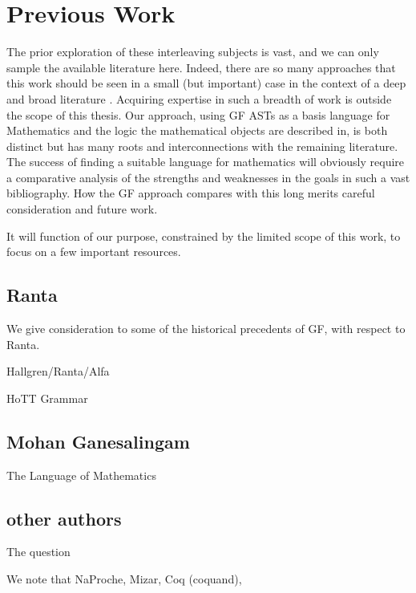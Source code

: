 \section{Previous Work}

The prior exploration of these interleaving subjects is vast, and we can only
sample the available literature here. Indeed, there are so many approaches that
this work should be seen in a small (but important) case in the context of a
deep and broad literature \cite{surveyLang}. Acquiring expertise in such a
breadth of work is outside the scope of this thesis. Our approach, using
GF ASTs as a basis language for Mathematics and the logic the mathematical
objects are described in, is both distinct but has many roots and
interconnections with the remaining literature. The success of finding a
suitable language for mathematics will obviously require a comparative analysis
of the strengths and weaknesses in the goals in such a vast bibliography. 
 How the GF approach compares with this long merits careful consideration and
 future work.

It will function of our purpose, constrained by the limited scope of this work,
to focus on a few important resources.

\subsection{Ranta}

We give consideration to some of the historical precedents of GF, with respect
to Ranta. 

Hallgren/Ranta/Alfa

HoTT Grammar

\subsection{Mohan Ganesalingam}

The Language of Mathematics

\subsection{other authors}

The question 

We note that 
NaProche, Mizar, Coq (coquand), 
